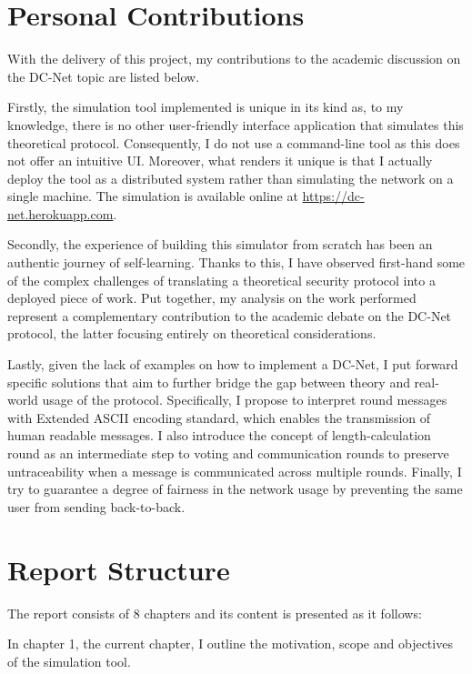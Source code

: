 \section{Personal Contributions}
With the delivery of this project, my contributions to the academic discussion on the DC-Net topic are listed below. \newline

Firstly, the simulation tool implemented is unique in its kind as, to my knowledge, there is no other user-friendly interface application that simulates this theoretical protocol. Consequently, I do not use a command-line tool as this does not offer an intuitive UI.  Moreover, what renders it unique is that I actually deploy the tool as a distributed system rather than simulating the network on a single machine. The simulation is available online at \url{https://dc-net.herokuapp.com}. \newline

Secondly, the experience of building this simulator from scratch has been an authentic journey of self-learning. Thanks to this, I have observed first-hand some of the complex challenges of translating a theoretical security protocol into a deployed piece of work.
Put together, my analysis on the work performed represent a complementary contribution to the academic debate on the DC-Net protocol, the latter focusing entirely on theoretical considerations. \newline


Lastly, given the lack of examples on how to implement a DC-Net, I put forward specific solutions that aim to further bridge the gap between theory and real-world usage of the protocol. Specifically, I propose to interpret round messages with Extended ASCII encoding standard, which enables the transmission of human readable messages. I also introduce the concept of length-calculation round as an intermediate step to voting and communication rounds to preserve untraceability when a message is communicated across multiple rounds. Finally, I try to guarantee a degree of fairness in the network usage by preventing the same user from sending back-to-back.


\section{Report Structure}

The report consists of 8 chapters and its content is presented as it follows:

In chapter 1, the current chapter, I outline the motivation, scope and objectives of the simulation tool.

